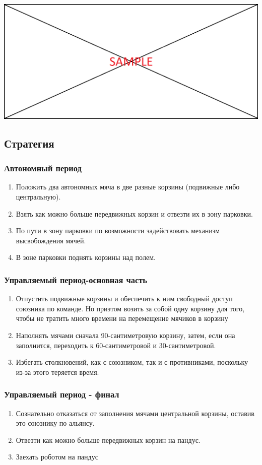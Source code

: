 \documentclass[11pt]{article}
\newcommand\measurepage{\dimexpr\pagegoal-\pagetotal-\baselineskip\relax}
\newcommand\fillpage{\includegraphics[width=\textwidth, height=\measurepage]{img/fill_page}}
\begin{document}
      \fillpage

     \subsection{Стратегия} 
        \subsubsection{Автономный период}
          \begin{enumerate}
             \item Положить два автономных мяча в две разные корзины (подвижные либо центральную).
             \item Взять как можно больше передвижных корзин и отвезти их в зону парковки.
             \item По пути в зону парковки по возможности задействовать механизм высвобождения мячей.
             \item В зоне парковки поднять корзины над полем.         
          \end{enumerate}
         \subsubsection{Управляемый период-основная часть}
         \begin{enumerate}
            \item Отпустить подвижные корзины и обеспечить к ним свободный доступ союзника по команде. Но приэтом возить за собой одну корзину для того, чтобы не тратить много времени на перемещение мячиков в корзину
            \item Наполнять мячами сначала 90-сантиметровую корзину, затем, если она заполнится, переходить к 60-сантиметровой и 30-сантиметровой.
            \item Избегать столкновений, как с союзником, так и с противниками, поскольку из-за этого теряется время.
         \end{enumerate}
         \subsubsection{Управляемый период - финал}
         \begin{enumerate}
         \item Сознательно отказаться от заполнения мячами центральной корзины, оставив это союзнику по альянсу.
         \item Отвезти как можно больше передвижных корзин на пандус.
         \item Заехать роботом на пандус 
         \end{enumerate}
\end{document}
